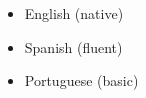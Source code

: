 
\begin{itemize}
    \item English (native)
    \item Spanish (fluent)
    \item Portuguese (basic)
\end{itemize}